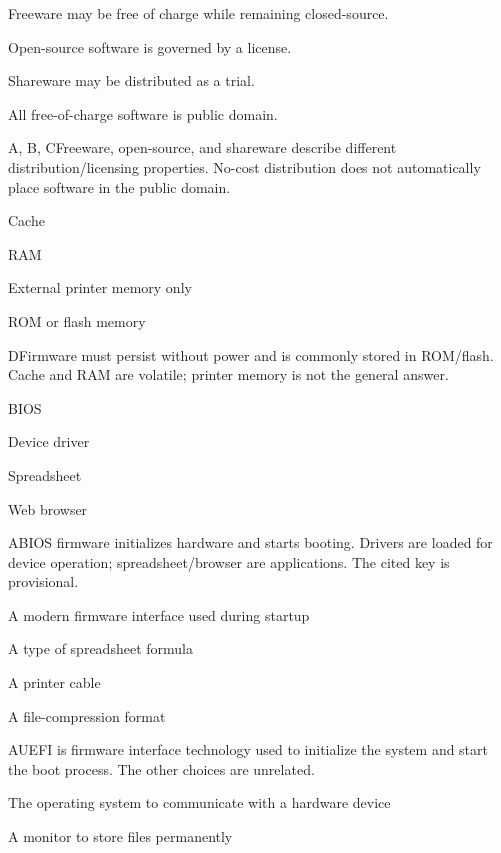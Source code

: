 \begin{enumerate}[label=\textbf{Q\arabic*.}, leftmargin=*]
  {\item Freeware may be free of charge while remaining closed-source.
   \item Open-source software is governed by a license.
   \item Shareware may be distributed as a trial.
   \item All free-of-charge software is public domain.}
  {A, B, C}{Freeware, open-source, and shareware describe different distribution/licensing properties. No-cost distribution does not automatically place software in the public domain.}
\fi
\ifnum{}
  {\item Cache
   \item RAM
   \item External printer memory only
   \item ROM or flash memory}
  {D}{Firmware must persist without power and is commonly stored in ROM/flash. Cache and RAM are volatile; printer memory is not the general answer.}
  {\item BIOS
   \item Device driver
   \item Spreadsheet
   \item Web browser}
  {A}{BIOS firmware initializes hardware and starts booting. Drivers are loaded for device operation; spreadsheet/browser are applications. The cited key is provisional.}
  {\item A modern firmware interface used during startup
   \item A type of spreadsheet formula
   \item A printer cable
   \item A file-compression format}
  {A}{UEFI is firmware interface technology used to initialize the system and start the boot process. The other choices are unrelated.}
  {\item The operating system to communicate with a hardware device
   \item A monitor to store files permanently
}
\end{enumerate}
